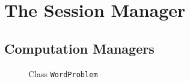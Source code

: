 

\section{The Session Manager}

\subsection{Computation Managers}

\begin{figure}[htbp]
\caption{Class {\tt WordProblem}}\label{CMs}
\end{figure}
